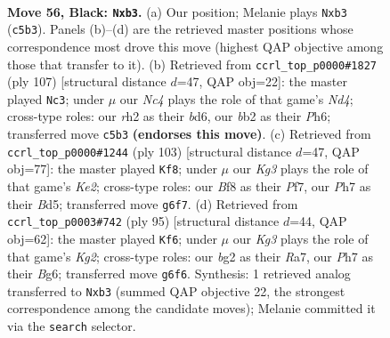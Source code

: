 \documentclass[11pt]{article}
\begin{document}
\clearpage

\begin{figure}[p]\centering
\begin{subfigure}{0.46\textwidth}\centering
\resizebox{\linewidth}{!}{%
\newchessgame
\chessboard[
  setfen={3r1b2/7p/p2p2k1/P1n1p2p/2P1P3/1P3P2/1B2K1BR/8 b - - 9 56},
  showmover=false,
  pgfstyle=straightmove, color=movearrow, markmove={c5-b3}
]}
\caption{}
\end{subfigure}\hfill
\begin{subfigure}{0.46\textwidth}\centering
\resizebox{\linewidth}{!}{%
\newchessgame
\chessboard[
  setfen={8/5k2/p2B1p1p/P2np1p1/BPb3P1/5P1P/7K/8 b - - 9 54},
  showmover=false,
  pgfstyle=straightmove, color=movearrow, markmove={d5-c3}
]}
\caption{}
\end{subfigure}
\\[4pt]
\begin{subfigure}{0.46\textwidth}\centering
\resizebox{\linewidth}{!}{%
\newchessgame
\chessboard[
  setfen={8/4kp2/p1n1p3/Pp1bP3/1P1p1PPK/3B4/3B4/8 b - - 34 52},
  showmover=false,
  pgfstyle=straightmove, color=movearrow, markmove={e7-f8}
]}
\caption{}
\end{subfigure}\hfill
\begin{subfigure}{0.46\textwidth}\centering
\resizebox{\linewidth}{!}{%
\newchessgame
\chessboard[
  setfen={8/rp4k1/2p1n1b1/p1Pp1p1p/P2P3P/2K1B1P1/1R6/3B4 b - - 20 48},
  showmover=false,
  pgfstyle=straightmove, color=movearrow, markmove={g7-f6}
]}
\caption{}
\end{subfigure}
\caption{\textbf{Move 56, Black: \texttt{Nxb3}.} (a) Our position; Melanie plays \texttt{Nxb3} (\texttt{c5b3}). Panels (b)--(d) are the retrieved master positions whose correspondence most drove this move (highest QAP objective among those that transfer to it). (b) Retrieved from \texttt{ccrl\_top\_p0000\#1827} (ply 107) [structural distance $d$=47, QAP obj=22]: the master played \texttt{Nc3}; under $\mu$ our \emph{Nc4} plays the role of that game's \emph{Nd4}; cross-type roles: our \emph{r}h2 as their \emph{b}d6, our \emph{b}b2 as their \emph{P}h6; transferred move \texttt{c5b3} \textbf{(endorses this move)}. (c) Retrieved from \texttt{ccrl\_top\_p0000\#1244} (ply 103) [structural distance $d$=47, QAP obj=77]: the master played \texttt{Kf8}; under $\mu$ our \emph{Kg3} plays the role of that game's \emph{Ke2}; cross-type roles: our \emph{B}f8 as their \emph{P}f7, our \emph{P}h7 as their \emph{B}d5; transferred move \texttt{g6f7}. (d) Retrieved from \texttt{ccrl\_top\_p0003\#742} (ply 95) [structural distance $d$=44, QAP obj=62]: the master played \texttt{Kf6}; under $\mu$ our \emph{Kg3} plays the role of that game's \emph{Kg2}; cross-type roles: our \emph{b}g2 as their \emph{R}a7, our \emph{P}h7 as their \emph{B}g6; transferred move \texttt{g6f6}. Synthesis: 1 retrieved analog transferred to \texttt{Nxb3} (summed QAP objective 22, the strongest correspondence among the candidate moves); Melanie committed it via the \texttt{search} selector.}
\label{fig:thought-m111}
\end{figure}
\end{document}

